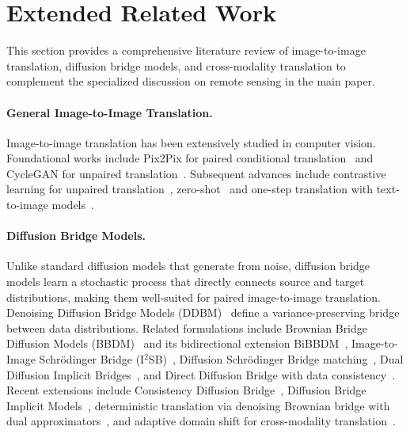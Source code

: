 \clearpage
\hypersetup{pageanchor=false}
\setcounter{page}{1}
\maketitlesupplementary

\section{Extended Related Work}
\label{sec:appendix}
\label{sec:suppl_related_work}

This section provides a comprehensive literature review of image-to-image translation, diffusion bridge models, and cross-modality translation to complement the specialized discussion on remote sensing in the main paper.

\paragraph{General Image-to-Image Translation.}
Image-to-image translation has been extensively studied in computer vision. Foundational works include Pix2Pix for paired conditional translation~\cite{isolaImageToImageTranslationConditional2017} and CycleGAN for unpaired translation~\cite{zhuUnpairedImageToImageTranslation2017}. Subsequent advances include contrastive learning for unpaired translation~\cite{parkContrastiveLearningUnpaired2020}, zero-shot~\cite{parmarZeroshotImagetoImageTranslation2023} and one-step translation with text-to-image models~\cite{parmarOneStepImageTranslation2024}.

\paragraph{Diffusion Bridge Models.}
Unlike standard diffusion models that generate from noise, diffusion bridge models learn a stochastic process that directly connects source and target distributions, making them well-suited for paired image-to-image translation. Denoising Diffusion Bridge Models (DDBM)~\cite{zhouDenoisingDiffusionBridge2024} define a variance-preserving bridge between data distributions. Related formulations include Brownian Bridge Diffusion Models (BBDM)~\cite{Li_2023_CVPR} and its bidirectional extension BiBBDM~\cite{xueBiBBDMBidirectionalImage2025}, Image-to-Image Schr\"odinger Bridge (I$^2$SB)~\cite{liuI2SBImagetoImageSchrodinger2023}, Diffusion Schr\"odinger Bridge matching~\cite{shiDiffusionSchrodingerBridge2023}, Dual Diffusion Implicit Bridges~\cite{suDualDiffusionImplicit2023a}, and Direct Diffusion Bridge with data consistency~\cite{chungDirectDiffusionBridge2023}. Recent extensions include Consistency Diffusion Bridge~\cite{heConsistencyDiffusionBridge2024}, Diffusion Bridge Implicit Models~\cite{zhengDiffusionBridgeImplicit2025}, deterministic translation via denoising Brownian bridge with dual approximators~\cite{xiaoDeterministicImagetoImageTranslation2025a}, and adaptive domain shift for cross-modality translation~\cite{wangAdaptiveDomainShift2026a}.

